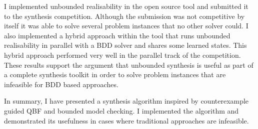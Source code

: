 I implemented unbounded realisability in the open source \termitesat tool and submitted it to the synthesis competition. Although the submission was not competitive by itself it was able to solve several problem instances that no other solver could. I also implemented a hybrid approach within the tool that runs unbounded realisability in parallel with a BDD solver and shares some learned states. This hybrid approach performed very well in the parallel track of the competition. These results support the argument that unbounded synthesis is useful as part of a complete synthesis toolkit in order to solve problem instances that are infeasible for BDD based approaches.

In summary, I have presented a synthesis algorithm inspired by counterexample guided QBF and bounded model checking. I implemented the algorithm and demonstrated its usefulness in cases where traditional approaches are infeasible.
